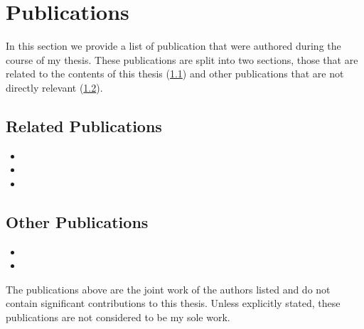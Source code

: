 \section{Publications}\label{sec:intro_pubs}
In this section we provide a list of publication that were authored during the
course of my thesis. These publications are split into two sections, those
that are related to the contents of this thesis 
(\cref{subsec:intro_rel_pubs}) and other publications that 
are not directly relevant (\cref{subsec:intro_other_pubs}).
\subsection{Related Publications}\label{subsec:intro_rel_pubs}
\begin{itemize}
	\item{}
	\item{}
	\item{}
\end{itemize}
\subsection{Other Publications}\label{subsec:intro_other_pubs}
\begin{itemize}
	\item{}
	\item{}
\end{itemize}
The publications above are the joint work of the authors listed and do not
contain significant contributions to this thesis. Unless explicitly stated,
these publications are not considered to be my sole work.
